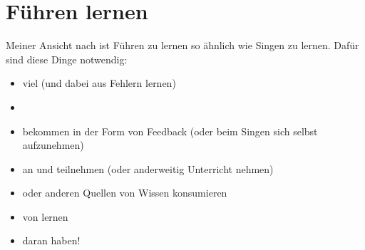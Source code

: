 \section{Führen lernen}
\label{fuehren-lernen}
\label{fuehrung-lernen}

Meiner Ansicht nach ist Führen zu lernen so ähnlich wie Singen zu lernen. Dafür sind diese Dinge notwendig:

\begin{itemize}
  \item viel  (und dabei aus Fehlern lernen)
  \item {}
  \item {} bekommen in der Form von Feedback (oder beim Singen sich selbst aufzunehmen)
  \item an  und  teilnehmen (oder anderweitig Unterricht nehmen)
  \item {} oder anderen Quellen von Wissen konsumieren
  \item von  lernen
  \item {} daran haben!
\end{itemize}

